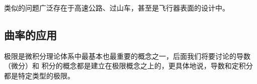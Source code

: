 \begin{center}
	\quad
\end{center}

类似的问题广泛存在于高速公路、过山车，甚至是飞行器表面的设计中。

\subsection{曲率的应用}

极限是微积分理论体系中最基本也最重要的概念之一，后面我们将要讨论的导数（微分）和
积分的概念都是建立在极限概念之上的，更具体地说，导数和定积分都是特定类型的极限。

